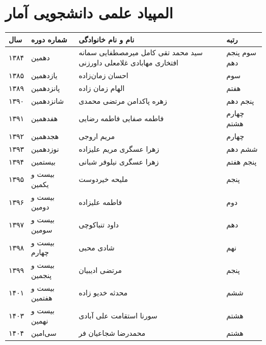 \documentclass[
  letterpaper,
  DIV=11,
  numbers=noendperiod]{scrreprt}
\newcounter{none} %
\begin{document}
\section{المپیاد علمی دانشجویی
آمار}\label{ux627ux644ux645ux67eux6ccux627ux62f-ux639ux644ux645ux6cc-ux62fux627ux646ux634ux62cux648ux6ccux6cc-ux622ux645ux627ux631}

{\def\LTcaptype{none} %
\begin{longtable}[]{@{}
  >{\raggedright\arraybackslash}p{}
  >{\raggedright\arraybackslash}p{}
  >{\raggedright\arraybackslash}p{}
  >{\raggedright\arraybackslash}p{}@{}}
\toprule\noalign{}
\begin{minipage}[b]{\linewidth}\raggedright
سال
\end{minipage} & \begin{minipage}[b]{\linewidth}\raggedright
شماره دوره
\end{minipage} & \begin{minipage}[b]{\linewidth}\raggedright
نام و نام خانوادگی
\end{minipage} & \begin{minipage}[b]{\linewidth}\raggedright
رتبه
\end{minipage} \\
\midrule\noalign{}
\endhead
\bottomrule\noalign{}
\endlastfoot
۱۳۸۴ & دهمین & سید محمد تقی کامل میرمصطفایی سمانه افتخاری مهابادی
غلامعلی داورزنی & سوم پنجم دهم \\
۱۳۸۵ & یازدهمین & احسان زمان‌زاده & سوم \\
۱۳۸۹ & پانزدهمین & الهام زمان زاده & هفتم \\
۱۳۹۰ & شانزدهمین & زهره پاکدامن مرتضی محمدی & پنجم دهم \\
۱۳۹۱ & هفدهمین & فاطمه صفایی فاطمه رضایی & چهارم هشتم \\
۱۳۹۲ & هجدهمین & مریم اروجی & چهارم \\
۱۳۹۳ & نوزدهمین & زهرا عسگری مریم علیزاده & ششم دهم \\
۱۳۹۴ & بیستمین & زهرا عسگری نیلوفر شبانی & پنجم هفتم \\
۱۳۹۵ & بیست و یکمین & ملیحه خیردوست & پنجم \\
۱۳۹۶ & بیست و دومین & فاطمه علیزاده & دوم \\
۱۳۹۷ & بیست و سومین & داود تنباکوچی & دهم \\
۱۳۹۸ & بیست و چهارم & شادی محبی & نهم \\
۱۳۹۹ & بیست و پنجمین & مرتضی ادیبیان & پنجم \\
۱۴۰۱ & بیست و هفتمین & محدثه خدیو زاده & ششم \\
۱۴۰۳ & بیست و نهمین & سورنا استقامت علی آبادی & هشتم \\
۱۴۰۴ & سی‌امین & محمدرضا شجاعیان فر & هشتم \\
\end{longtable}
}
\end{document}
